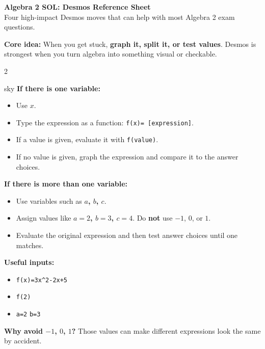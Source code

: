 \documentclass[11pt]{article}
\newcommand{\code}[1]{\texttt{#1}}
\begin{document}
{\Large\bfseries Algebra 2 SOL: Desmos Reference Sheet}\\[2pt]
{\small Four high-impact Desmos moves that can help with most Algebra 2 exam questions.}

\vspace{0.5em}
\begin{tcolorbox}[colback=sky,colframe=navy,boxrule=0.9pt,arc=2mm,left=2mm,right=2mm,top=1.5mm,bottom=1.5mm]
\textbf{Core idea:} When you get stuck, \textbf{graph it, split it, or test values}. Desmos is strongest when you turn algebra into something visual or checkable.
\end{tcolorbox}

\vspace{0.5em}
\begin{multicols}{2}

\begin{skillbox}{sky}
\textbf{If there is one variable:}
\begin{itemize}
  \item Use \textbf{$x$}.
  \item Type the expression as a function: \code{f(x)= [expression]}.
  \item If a value is given, evaluate it with \code{f(value)}.
  \item If no value is given, graph the expression and compare it to the answer choices.
\end{itemize}

\textbf{If there is more than one variable:}
\begin{itemize}
  \item Use variables such as \textbf{$a$, $b$, $c$}.
  \item Assign values like \textbf{$a=2$, $b=3$, $c=4$}. Do \textbf{not} use $-1$, $0$, or $1$.
  \item Evaluate the original expression and then test answer choices until one matches.
\end{itemize}

\textbf{Useful inputs:}
\begin{itemize}
  \item \code{f(x)=3x\^{}2-2x+5}
  \item \code{f(2)}
  \item \code{a=2} \hspace{1em} \code{b=3}
\end{itemize}

\textbf{Why avoid $-1$, $0$, $1$?} Those values can make different expressions look the same by accident.
\end{skillbox}


\end{multicols}
\end{document}
